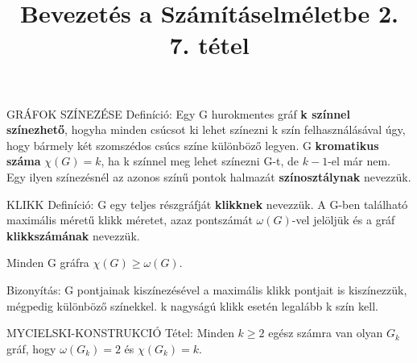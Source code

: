 \documentclass[]{article}
\title{Bevezetés a Számításelméletbe 2.\\{\large 7. tétel}}
\begin{document}
\maketitle
\begin{shaded}
GRÁFOK SZÍNEZÉSE Definíció: Egy G hurokmentes gráf \textbf{k színnel színezhető}, hogyha minden csúcsot ki lehet színezni k szín felhasználásával úgy, hogy bármely két szomszédos csúcs színe különböző legyen. G \textbf{kromatikus száma} $\chi(G) = k$, ha k színnel meg lehet színezni G-t, de $k - 1$-el már nem. Egy ilyen színezésnél az azonos színű pontok halmazát \textbf{színosztálynak} nevezzük.
\end{shaded}
\begin{shaded}
KLIKK Definíció: G egy teljes részgráfját \textbf{klikknek} nevezzük. A G-ben található maximális méretű klikk méretet, azaz pontszámát $\omega(G)$-vel jelöljük és a gráf \textbf{klikkszámának} nevezzük.
\end{shaded}
\begin{framed}
Minden G gráfra $\chi(G) \geq \omega(G)$.
\end{framed}
\begin{leftbar}
Bizonyítás: G pontjainak kiszínezésével a maximális klikk pontjait is kiszínezzük, mégpedig különböző színekkel. k nagyságú klikk esetén legalább k szín kell.
\end{leftbar}
\begin{framed}
MYCIELSKI-KONSTRUKCIÓ Tétel: Minden $k \geq 2$ egész számra van olyan $G_k$ gráf, hogy $\omega(G_k) = 2$ és $\chi(G_k) = k$.
\end{framed}
\end{document}
